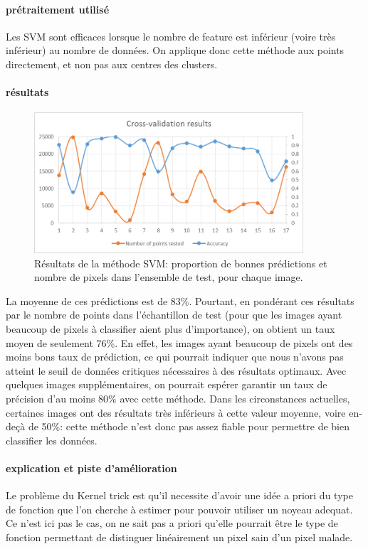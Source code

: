 \documentclass[a4paper,10pt]{report}
\begin{document}
\paragraph{prétraitement utilisé}
Les SVM sont efficaces lorsque le nombre de feature est inférieur (voire très inférieur) au nombre de données. On applique donc cette méthode aux points directement, et non pas aux centres des clusters.

\paragraph{résultats}
\begin{figure}[htbp]
  \caption{Résultats de la méthode SVM: proportion de bonnes prédictions et nombre de pixels dans l'ensemble de test, pour chaque image.}
  \centering
  \includegraphics[width=10cm]{SVM_CV.png}
\end{figure}

La moyenne de ces prédictions est de 83\%.
Pourtant, en pondérant ces résultats par le nombre de points dans l'échantillon de test (pour que les images ayant beaucoup de pixels à classifier aient plus d'importance), on obtient un taux moyen de seulement 76\%. En effet, les images ayant beaucoup de pixels ont des moins bons taux de prédiction, ce qui pourrait indiquer que nous n'avons pas atteint le seuil de données critiques nécessaires à des résultats optimaux. Avec quelques images supplémentaires, on pourrait espérer garantir un taux de précision d'au moins 80\% avec cette méthode. 
Dans les circonstances actuelles, certaines images ont des résultats très inférieurs à cette valeur moyenne, voire en-deçà de 50\%: cette méthode n'est donc pas assez fiable pour permettre de bien classifier les données.

\paragraph{explication et piste d'amélioration}
Le problème du Kernel trick est qu'il necessite d'avoir une idée a priori du type de fonction que l'on cherche à estimer pour pouvoir utiliser un noyeau adequat. Ce n'est ici pas le cas, on ne sait pas a priori qu'elle pourrait être le type de fonction permettant de distinguer linéairement un pixel sain d'un pixel malade.
\end{document}
